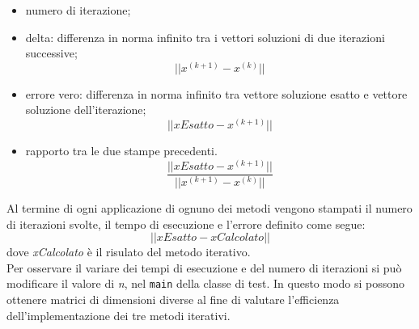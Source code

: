\documentclass[12pt]{article}
\begin{document}
\begin{itemize}
    \item numero di iterazione;
    \item delta: differenza in norma infinito tra i vettori soluzioni di due iterazioni successive;
    \begin{equation*}
        || x^{(k+1)} -x^{(k)} ||
    \end{equation*}
    \item errore vero: differenza in norma infinito tra vettore soluzione esatto e vettore soluzione dell'iterazione;
    \begin{equation*}
        || xEsatto - x^{(k+1)} ||
    \end{equation*}
    \item rapporto tra le due stampe precedenti.
    \begin{equation*}
        \frac{|| xEsatto - x^{(k+1)} ||}{|| x^{(k+1)} -x^{(k)} ||}
    \end{equation*}
\end{itemize}
Al termine di ogni applicazione di ognuno dei metodi vengono stampati il numero di iterazioni svolte, il tempo di esecuzione e l'errore definito come segue:
\begin{equation*}
    || xEsatto - xCalcolato ||
\end{equation*}
dove \textit{xCalcolato} è il risulato del metodo iterativo.\\ Per osservare il variare dei tempi di esecuzione e del numero di iterazioni si può modificare il valore di \textit{n}, nel \texttt{main} della classe di test. In questo modo si possono ottenere matrici di dimensioni diverse al fine di valutare l'efficienza dell'implementazione dei tre metodi iterativi.
\end{document}
